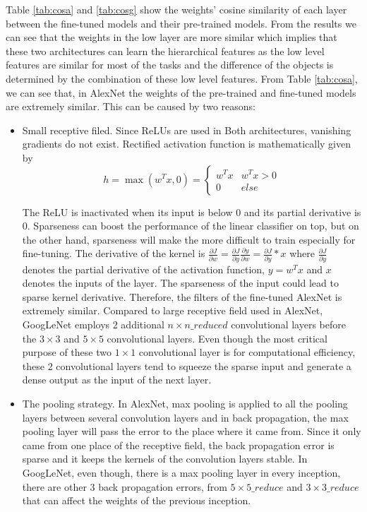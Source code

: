 Table \ref{tab:cosa} and \ref{tab:cosg} show the weights' cosine similarity of each layer between the fine-tuned models and their pre-trained models. From the results we can see that the weights in the low layer are more similar which implies that these two architectures can learn the hierarchical features as the low level features are similar for most of the tasks and the difference of the objects is determined by the combination of these low level features. From Table \ref{tab:cosa}, we can see that, in AlexNet the weights of the pre-trained and fine-tuned models are extremely similar. This can be caused by two reasons:
\begin{itemize}
  \item Small receptive filed. Since ReLUs are used in Both architectures, vanishing gradients do not exist. Rectified activation function is mathematically given by
      \begin{equation}\label{relu}
        h = \max ({w^T}x,0) = \left\{ {\begin{array}{*{20}{c}}
{{w^T}x}&{{w^T}x > 0}\\
0&{else}
\end{array}} \right.
      \end{equation}

    The ReLU is inactivated when its input is below 0 and its partial derivative is 0. Sparseness can boost the performance of the linear classifier on top, but on the other hand, sparseness will make the more difficult to train especially for fine-tuning. The derivative of the kernel is $\frac{{\partial J}}{{\partial w}} = \frac{{\partial J}}{{\partial y}}\frac{{\partial y}}{{\partial w}} = \frac{{\partial J}}{{\partial y}}*x$ where $\frac{{\partial J}}{{\partial y}}$ denotes the partial derivative of the activation function, $y=w^Tx$ and $x$ denotes the inputs of the layer. The sparseness of the input could lead to sparse kernel derivative. Therefore, the filters of the fine-tuned AlexNet is extremely similar. Compared to large receptive field used in AlexNet, GoogLeNet employs 2 additional $n\times n\_reduced$ convolutional layers before the $3\times 3$ and $5\times 5$ convolutional layers. Even though the most critical purpose of these two $1\times 1$ convolutional layer is for computational efficiency, these 2 convolutional layers tend to squeeze the sparse input and generate a dense output as the input of the next layer.
  \item The pooling strategy. In AlexNet, max pooling is applied to all the pooling layers between several convolution layers and in back propagation, the max pooling layer will pass the error to the place where it came from. Since it only came from one place of the receptive field, the back propagation error is sparse and it keeps the kernels of the convolution layers stable. In GoogLeNet, even though, there is a max pooling layer in every inception, there are other 3 back propagation errors, from $5\times 5\_reduce$ and $3\times 3\_reduce$ that can affect the weights of the previous inception.
\end{itemize}

